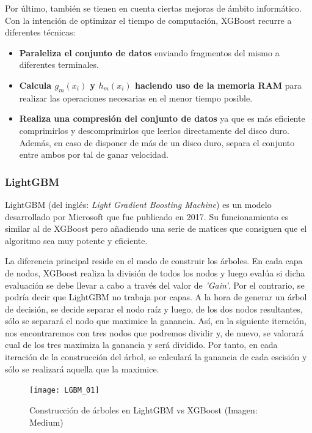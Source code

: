\documentclass[12pt,twoside]{article}
\begin{document}
Por último, también se tienen en cuenta ciertas mejoras de ámbito informático. Con la intención de optimizar el tiempo de computación, XGBoost recurre a diferentes técnicas: 
\begin{itemize}
\item \textbf{Paraleliza el conjunto de datos} enviando fragmentos del mismo a diferentes terminales.

\item \textbf{Calcula $g_m(x_i)$ y $h_m(x_i)$ haciendo uso de la memoria RAM} para realizar las operaciones necesarias en el menor tiempo posible.

\item \textbf{Realiza una compresión del conjunto de datos} ya que es más eficiente comprimirlos y descomprimirlos que leerlos directamente del disco duro. Además, en caso de disponer de más de un disco duro, separa el conjunto entre ambos por tal de ganar velocidad.
\end{itemize}



\subsubsection{LightGBM}

LightGBM (del inglés: \textit{Light Gradient Boosting Machine}) es un modelo desarrollado por Microsoft que fue publicado en 2017. Su funcionamiento es similar al de XGBoost pero añadiendo una serie de matices que consiguen que el algoritmo sea muy potente y eficiente.

La diferencia principal reside en el modo de construir los árboles. En cada capa de nodos, XGBoost realiza la división de todos los nodos y luego evalúa si dicha evaluación se debe llevar a cabo a través del valor de \textit{'Gain'}. Por el contrario, se podría decir que LightGBM no trabaja por capas. A la hora de generar un árbol de decisión, se decide separar el nodo raíz y luego, de los dos nodos resultantes, sólo se separará el nodo que maximice la ganancia. Así, en la siguiente iteración, nos encontraremos con tres nodos que podremos dividir y, de nuevo, se valorará cual de los tres maximiza la ganancia y será dividido. Por tanto, en cada iteración de la construcción del árbol, se calculará la ganancia de cada escisión y sólo se realizará aquella que la maximice.

\begin{figure}[h]
\centering
\texttt{[image: LGBM\_01]}
\caption{Construcción de árboles en LightGBM vs XGBoost (Imagen: Medium)}
\end{figure}
\end{document}
